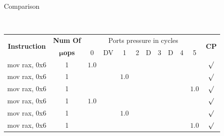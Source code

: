 \documentclass[10pt, tikz,border=2mm, xcolor=dvipsnames]{beamer}
\begin{document}
\begin{frame}[fragile]{Comparison}
\begin{mdframed}[backgroundcolor=light-gray, roundcorner=10pt,leftmargin=1, rightmargin=1, innerleftmargin=15, innertopmargin=5,innerbottommargin=5, outerlinewidth=1, linecolor=light-gray]
    \begin{minipage}{0.05\textwidth}
         \vspace{75pt} \\
    \end{minipage}
    \begin{minipage}{0.9\textwidth}
    \centering
    \begin{adjustbox}{height=0.17\textheight,width=0.9\textwidth} \begin{tabular}
            {|r|c|c c|c|c c|c c|c|c|c|}
            \hline
            \multicolumn{1}{|c|}{\multirow{2}{*}{\textbf{Instruction}}}&\textbf{Num Of} & \multicolumn{9}{|c|}{Ports pressure in cycles} &\multirow{2}{*}{\textbf{CP}}\\
            \cline{3-11}
            &$\boldsymbol{\mu}$\textbf{ops} & 0 & DV & 1 & 2 & D & 3 & D & 4 & 5 & \\ \cline{1-12}
            mov rax, 0x6 & 1 & $1.0$ &       &       &       &       &       &       &       &       & $\surd$\\
            mov rax, 0x6 & 1 &       &       & $1.0$ &       &       &       &       &       &       & $\surd$\\
            mov rax, 0x6 & 1 &       &       &       &       &       &       &       &       & $1.0$ & $\surd$\\
            mov rax, 0x6 & 1 & $1.0$ &       &       &       &       &       &       &       &       & $\surd$\\
            mov rax, 0x6 & 1 &       &       & $1.0$ &       &       &       &       &       &       & $\surd$\\
            mov rax, 0x6 & 1 &       &       &       &       &       &       &       &       & $1.0$ & $\surd$\\
            \hline
    \end{tabular}\end{adjustbox}\\ \vspace{0.5cm}

\end{minipage}
\end{mdframed}
\end{frame}
\end{document}
